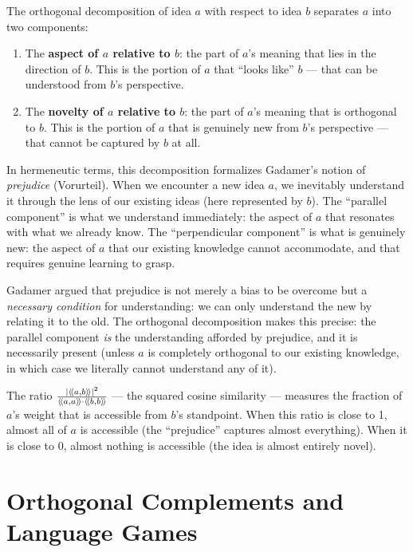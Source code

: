 \begin{interpretation}
\label{interp:aspect}
The orthogonal decomposition of idea $a$ with respect to idea $b$ separates $a$
into two components:

\begin{enumerate}
\item The \textbf{aspect of $a$ relative to $b$}: the part of $a$'s meaning
that lies in the direction of $b$. This is the portion of $a$ that ``looks
like'' $b$ --- that can be understood from $b$'s perspective.

\item The \textbf{novelty of $a$ relative to $b$}: the part of $a$'s meaning
that is orthogonal to $b$. This is the portion of $a$ that is genuinely new
from $b$'s perspective --- that cannot be captured by $b$ at all.
\end{enumerate}

In hermeneutic terms, this decomposition formalizes Gadamer's notion of
\emph{prejudice} (Vorurteil). When we encounter a new idea $a$, we inevitably
understand it through the lens of our existing ideas (here represented by $b$).
The ``parallel component'' is what we understand immediately: the aspect of $a$
that resonates with what we already know. The ``perpendicular component'' is
what is genuinely new: the aspect of $a$ that our existing knowledge cannot
accommodate, and that requires genuine learning to grasp.

Gadamer argued that prejudice is not merely a bias to be overcome but a
\emph{necessary condition} for understanding: we can only understand the new
by relating it to the old. The orthogonal decomposition makes this precise:
the parallel component \emph{is} the understanding afforded by prejudice,
and it is necessarily present (unless $a$ is completely orthogonal to our
existing knowledge, in which case we literally cannot understand any of it).

The ratio $\frac{|\langle\!\langle a, b \rangle\!\rangle|^2}{\langle\!\langle a, a \rangle\!\rangle \cdot \langle\!\langle b, b \rangle\!\rangle}$ --- the squared
cosine similarity --- measures the fraction of $a$'s weight that is accessible
from $b$'s standpoint. When this ratio is close to 1, almost all of $a$ is
accessible (the ``prejudice'' captures almost everything). When it is close
to 0, almost nothing is accessible (the idea is almost entirely novel).
\end{interpretation}


\section{Orthogonal Complements and Language Games}

